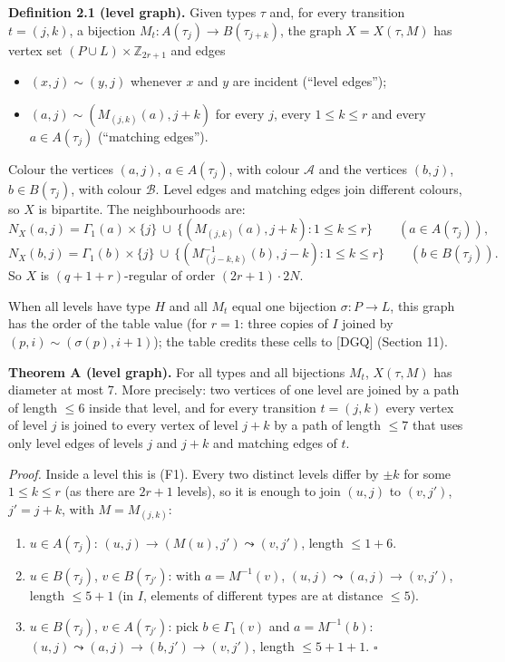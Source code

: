 \documentclass[
  11pt,
]{article}
\providecommand{\tightlist}{%
  \setlength{\itemsep}{0pt}\setlength{\parskip}{0pt}}
\begin{document}
\textbf{Definition 2.1 (level graph).} Given types \(\tau\) and, for every transition \(t=(j,k)\), a bijection
\(M_t: A(\tau_j)\to B(\tau_{j+k})\), the graph \(X = X(\tau, M)\) has vertex set \((P\cup L)\times\mathbb Z_{2r+1}\) and
edges

\begin{itemize}
\tightlist
\item
  \((x,j)\sim(y,j)\) whenever \(x\) and \(y\) are incident (``level edges'');
\item
  \((a,j)\sim(M_{(j,k)}(a), j+k)\) for every \(j\), every \(1\le k\le r\) and every \(a\in A(\tau_j)\) (``matching
  edges'').
\end{itemize}

Colour the vertices \((a,j)\), \(a\in A(\tau_j)\), with colour \(\mathcal A\) and the vertices \((b,j)\),
\(b\in B(\tau_j)\), with colour \(\mathcal B\). Level edges and matching edges join different colours, so \(X\) is
bipartite. The neighbourhoods are:
\[N_X(a,j) = \Gamma_1(a)\times\{j\}\ \cup\ \{(M_{(j,k)}(a), j+k) : 1\le k\le r\}\qquad (a\in A(\tau_j)),\]
\[N_X(b,j) = \Gamma_1(b)\times\{j\}\ \cup\ \{(M_{(j-k,k)}^{-1}(b), j-k) : 1\le k\le r\}\qquad (b\in B(\tau_j)).\] So
\(X\) is \((q+1+r)\)-regular of order \((2r+1)\cdot 2N\).

When all levels have type \(H\) and all \(M_t\) equal one bijection \(\sigma: P\to L\), this graph has the order of the
table value (for \(r=1\): three copies of \(I\) joined by \((p,i)\sim(\sigma(p),i+1)\)); the table credits these cells
to {[}DGQ{]} (Section 11).

\textbf{Theorem A (level graph).} For all types and all bijections \(M_t\), \(X(\tau, M)\) has diameter at most 7. More
precisely: two vertices of one level are joined by a path of length \(\le 6\) inside that level, and for every
transition \(t=(j,k)\) every vertex of level \(j\) is joined to every vertex of level \(j+k\) by a path of length
\(\le 7\) that uses only level edges of levels \(j\) and \(j+k\) and matching edges of \(t\).

\emph{Proof.} Inside a level this is (F1). Every two distinct levels differ by \(\pm k\) for some \(1\le k\le r\) (as
there are \(2r+1\) levels), so it is enough to join \((u,j)\) to \((v,j')\), \(j' = j+k\), with \(M = M_{(j,k)}\):

\begin{enumerate}
\def\labelenumi{\arabic{enumi}.}
\tightlist
\item
  \(u\in A(\tau_j)\): \((u,j)\to(M(u),j')\leadsto(v,j')\), length \(\le 1+6\).
\item
  \(u\in B(\tau_j)\), \(v\in B(\tau_{j'})\): with \(a = M^{-1}(v)\), \((u,j)\leadsto(a,j)\to(v,j')\), length \(\le 5+1\)
  (in \(I\), elements of different types are at distance \(\le 5\)).
\item
  \(u\in B(\tau_j)\), \(v\in A(\tau_{j'})\): pick \(b\in\Gamma_1(v)\) and \(a = M^{-1}(b)\):
  \((u,j)\leadsto(a,j)\to(b,j')\to(v,j')\), length \(\le 5+1+1\). \(\square\)
\end{enumerate}
\end{document}
